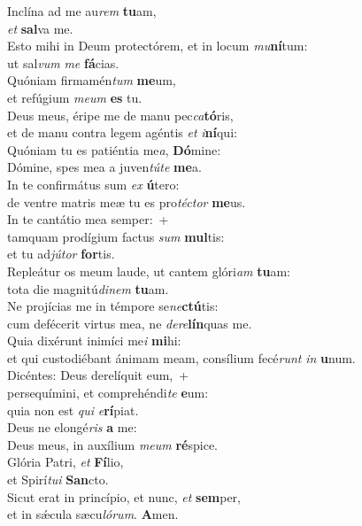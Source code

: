 \evenverse Inclína ad me au\textit{rem} \textbf{tu}am,~\*\\
\evenverse \textit{et} \textbf{sal}va me.\\
\oddverse Esto mihi in Deum protectórem, et in locum \textit{mu}\textbf{ní}tum:~\*\\
\oddverse ut sal\textit{vum} \textit{me} \textbf{fá}cias.\\
\evenverse Quóniam firmamén\textit{tum} \textbf{me}um,~\*\\
\evenverse et refúgium \textit{me}\textit{um} \textbf{es} tu.\\
\oddverse Deus meus, éripe me de manu pec\textit{ca}\textbf{tó}ris,~\*\\
\oddverse et de manu contra legem agéntis \textit{et} \textit{i}\textbf{ní}qui:\\
\evenverse Quóniam tu es patiéntia me\textit{a}, \textbf{Dó}mine:~\*\\
\evenverse Dómine, spes mea a juven\textit{tú}\textit{te} \textbf{me}a.\\
\oddverse In te confirmátus sum \textit{ex} \textbf{ú}tero:~\*\\
\oddverse de ventre matris meæ tu es pro\textit{té}\textit{ctor} \textbf{me}us.\\
\evenverse In te cantátio mea semper:~+\\
\evenverse  tamquam prodígium factus \textit{sum} \textbf{mul}tis:~\*\\
\evenverse et tu ad\textit{jú}\textit{tor} \textbf{for}tis.\\
\oddverse Repleátur os meum laude, ut cantem glóri\textit{am} \textbf{tu}am:~\*\\
\oddverse tota die magnitú\textit{di}\textit{nem} \textbf{tu}am.\\
\evenverse Ne projícias me in témpore se\textit{ne}\textbf{ctú}tis:~\*\\
\evenverse cum defécerit virtus mea, ne \textit{de}\textit{re}\textbf{lín}quas me.\\
\oddverse Quia dixérunt inimíci me\textit{i} \textbf{mi}hi:~\*\\
\oddverse et qui custodiébant ánimam meam, consílium fecé\textit{runt} \textit{in} \textbf{u}num.\\
\evenverse Dicéntes: Deus derelíquit eum,~+\\
\evenverse  persequímini, et comprehéndi\textit{te} \textbf{e}um:~\*\\
\evenverse quia non est \textit{qui} \textit{e}\textbf{rí}piat.\\
\oddverse Deus ne elongé\textit{ris} \textbf{a} me:~\*\\
\oddverse Deus meus, in auxílium \textit{me}\textit{um} \textbf{ré}spice.\\
\evenverse Glória Patri, \textit{et} \textbf{Fí}lio,~\*\\
\evenverse et Spirí\textit{tu}\textit{i} \textbf{San}cto.\\
\oddverse Sicut erat in princípio, et nunc, \textit{et} \textbf{sem}per,~\*\\
\oddverse et in sǽcula sæcu\textit{ló}\textit{rum}. \textbf{A}men.\\
